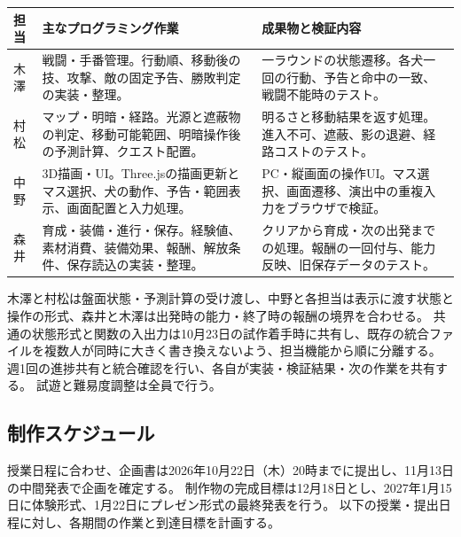 \documentclass[a4paper,11pt,dvipdfmx]{jsarticle}
\begin{document}
\begin{tabularx}{\linewidth}{@{}p{13mm}Y Y@{}}
\toprule
担当 & 主なプログラミング作業 & 成果物と検証内容 \\
\midrule
木澤 & 戦闘・手番管理。行動順、移動後の技、攻撃、敵の固定予告、勝敗判定の実装・整理。 & 一ラウンドの状態遷移。各犬一回の行動、予告と命中の一致、戦闘不能時のテスト。\\
村松 & マップ・明暗・経路。光源と遮蔽物の判定、移動可能範囲、明暗操作後の予測計算、クエスト配置。 & 明るさと移動結果を返す処理。進入不可、遮蔽、影の退避、経路コストのテスト。\\
中野 & 3D描画・UI。Three.jsの描画更新とマス選択、犬の動作、予告・範囲表示、画面配置と入力処理。 & PC・縦画面の操作UI。マス選択、画面遷移、演出中の重複入力をブラウザで検証。\\
森井 & 育成・装備・進行・保存。経験値、素材消費、装備効果、報酬、解放条件、保存読込の実装・整理。 & クリアから育成・次の出発までの処理。報酬の一回付与、能力反映、旧保存データのテスト。\\
\bottomrule
\end{tabularx}

木澤と村松は盤面状態・予測計算の受け渡し、中野と各担当は表示に渡す状態と操作の形式、森井と木澤は出発時の能力・終了時の報酬の境界を合わせる。
共通の状態形式と関数の入出力は10月23日の試作着手時に共有し、既存の統合ファイルを複数人が同時に大きく書き換えないよう、担当機能から順に分離する。
週1回の進捗共有と統合確認を行い、各自が実装・検証結果・次の作業を共有する。
試遊と難易度調整は全員で行う。

\subsection{制作スケジュール}
授業日程に合わせ、企画書は2026年10月22日（木）20時までに提出し、11月13日の中間発表で企画を確定する。
制作物の完成目標は12月18日とし、2027年1月15日に体験形式、1月22日にプレゼン形式の最終発表を行う。
以下の授業・提出日程に対し、各期間の作業と到達目標を計画する。
\end{document}
